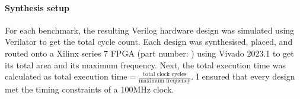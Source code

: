 \paragraph{Synthesis setup} For each benchmark, the resulting Verilog hardware
design was simulated using Verilator to get the total cycle count.  Each design
was synthesised, placed, and routed onto a Xilinx series 7 FPGA (part number:
) using Vivado 2023.1 to get its total area and its
maximum frequency.  Next, the total execution time was calculated as
$\text{total execution time} = \frac{\text{total clock cycles}}{\text{maximum
    frequency}}$.  I ensured that every design met the timing constraints of a
100MHz clock.



\newcommand\BambuDefault{%
\setul{-1pt}{3pt}\setulcolor{colorBambuDefaultLIGHT}%
{\ul{\textsf{Bambu-default}}}}

\newcommand\BambuNoOpt{%
\setul{-1pt}{3pt}\setulcolor{colorBambuNoOptLIGHT}%
{\ul{\textsf{Bambu-no-opt}}}}

\newcommand\VericertBase{%
\setul{-1pt}{3pt}\setulcolor{colorVericertBaseLIGHT}%
{\ul{\textsf{Vericert-no-scheduling}}}}

\newcommand\VericertList{%
\setul{-1pt}{3pt}\setulcolor{colorVericertListLIGHT}%
{\ul{\textsf{Vericert-list-scheduling}}}}

\newcommand\VericertHyper{%
\setul{-1pt}{3pt}\setulcolor{colorVericertHyperLIGHT}%
{\ul{\textsf{Vericert-hyperblock-scheduling}}}}


